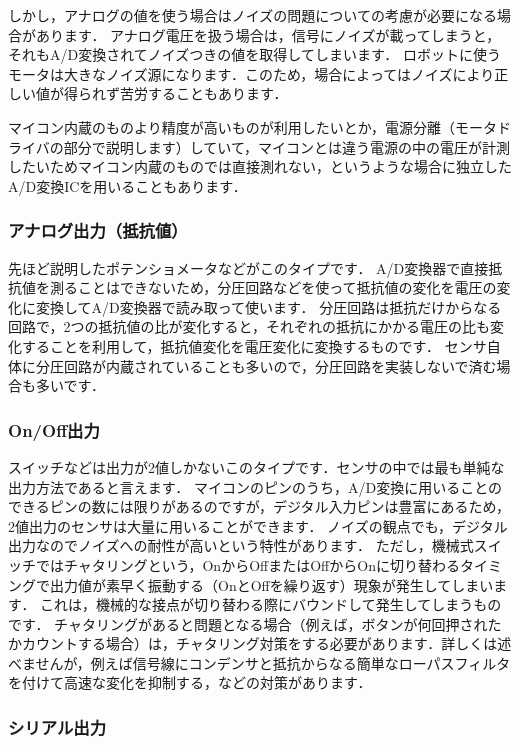 しかし，アナログの値を使う場合はノイズの問題についての考慮が必要になる場合があります．
アナログ電圧を扱う場合は，信号にノイズが載ってしまうと，それもA/D変換されてノイズつきの値を取得してしまいます．
ロボットに使うモータは大きなノイズ源になります．このため，場合によってはノイズにより正しい値が得られず苦労することもあります．

マイコン内蔵のものより精度が高いものが利用したいとか，電源分離（モータドライバの部分で説明します）していて，マイコンとは違う電源の中の電圧が計測したいためマイコン内蔵のものでは直接測れない，というような場合に独立したA/D変換ICを用いることもあります．

\subsubsection{アナログ出力（抵抗値）}

先ほど説明したポテンショメータなどがこのタイプです．
A/D変換器で直接抵抗値を測ることはできないため，分圧回路などを使って抵抗値の変化を電圧の変化に変換してA/D変換器で読み取って使います．
分圧回路は抵抗だけからなる回路で，2つの抵抗値の比が変化すると，それぞれの抵抗にかかる電圧の比も変化することを利用して，抵抗値変化を電圧変化に変換するものです．
センサ自体に分圧回路が内蔵されていることも多いので，分圧回路を実装しないで済む場合も多いです．

\subsubsection{On/Off出力}

スイッチなどは出力が2値しかないこのタイプです．センサの中では最も単純な出力方法であると言えます．
マイコンのピンのうち，A/D変換に用いることのできるピンの数には限りがあるのですが，デジタル入力ピンは豊富にあるため，2値出力のセンサは大量に用いることができます．
ノイズの観点でも，デジタル出力なのでノイズへの耐性が高いという特性があります．
ただし，機械式スイッチではチャタリングという，OnからOffまたはOffからOnに切り替わるタイミングで出力値が素早く振動する（OnとOffを繰り返す）現象が発生してしまいます．
これは，機械的な接点が切り替わる際にバウンドして発生してしまうものです．
チャタリングがあると問題となる場合（例えば，ボタンが何回押されたかカウントする場合）は，チャタリング対策をする必要があります．詳しくは述べませんが，例えば信号線にコンデンサと抵抗からなる簡単なローパスフィルタを付けて高速な変化を抑制する，などの対策があります．

\subsubsection{シリアル出力}

